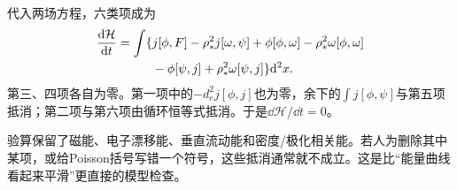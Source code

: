 代入两场方程，六类项成为
\begin{align}
 {\mathrm d\mathcal H\over\mathrm dt}
 =\int\{&
 j[\phi,F]-\rho_*^2j[\omega,\psi]
 +\phi[\phi,\omega]-\rho_*^2\omega[\phi,\omega]\\
 &-\phi[\psi,j]+\rho_*^2\omega[\psi,j]\}\mathrm d^2x.\nonumber
\end{align}
第三、四项各自为零。第一项中的$-d_e^2j[\phi,j]$也为零，余下的$\int j[\phi,\psi]$与第五项抵消；第二项与第六项由循环恒等式抵消。于是$\dd\mathcal H/\dd t=0$。

验算保留了磁能、电子漂移能、垂直流动能和密度/极化相关能。若人为删除其中某项，或给Poisson括号写错一个符号，这些抵消通常就不成立。这是比“能量曲线看起来平滑”更直接的模型检查。
